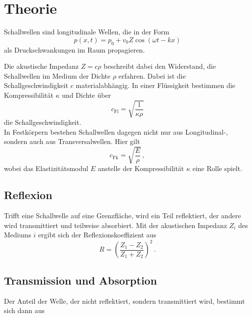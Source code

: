 \section{Theorie}
\label{sec:theorie}


Schallwellen sind longitudinale Wellen, die in der Form
\begin{equation}
    p(x, t) = p_0 + v_0 Z \cos(\omega t - k x)
    \label{eq:druckwelle}
\end{equation}
als Druckschwankungen im Raum propagieren.

Die akustische Impedanz $Z = c \rho$ beschreibt dabei den
Widerstand, die Schallwellen im Medium der Dichte $\rho$ %
erfahren.
Dabei ist die Schallgeschwindigkeit $c$ materialabhängig. In einer
Flüssigkeit bestimmen die Kompressibilität $\kappa$ %
und Dichte über
\begin{equation}
    c_\text{Fl} = \sqrt{\frac{1}{\kappa \rho}}
\end{equation}
die Schallgeschwindigkeit. \\

In Festkörpern bestehen Schallwellen dagegen nicht nur aus 
Longitudinal-, sondern auch aus Transversalwellen. %
Hier gilt
\begin{equation}
    c_\text{Fk} = \sqrt{\frac{E}{\rho}} \,,
\end{equation}
wobei das Elastizitätsmodul $E$ anstelle der Kompressibilität
$\kappa$ eine Rolle spielt. \\


\subsection{Reflexion}

Trifft eine Schallwelle auf eine Grenzfläche, wird ein Teil
reflektiert, der andere wird transmittiert und teilweise
absorbiert.
Mit der akustischen Impedanz $Z_i$ des Mediums $i$ ergibt sich
der Reflexionskoeffizient aus
\begin{equation}
    R = \left(\frac{Z_1 - Z_2}{Z_1 + Z_2}\right)^2 \,.
    \label{eq:reflexkoeff}
\end{equation}

\subsection{Transmission und Absorption}

Der Anteil der Welle, der nicht reflektiert, sondern%
transmittiert wird, bestimmt sich dann aus          %

